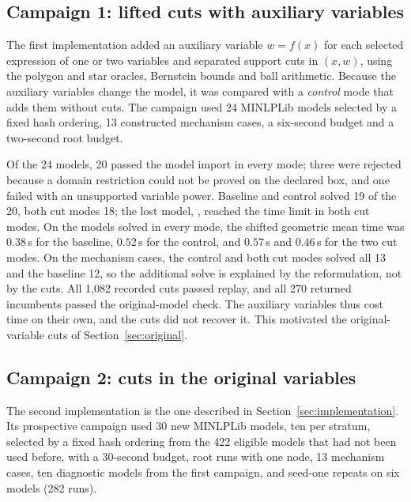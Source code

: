\subsection{Campaign 1: lifted cuts with auxiliary variables}\label{sec:campaign1}

The first implementation added an auxiliary variable $w=f(x)$ for each
selected expression of one or two variables and separated support cuts in
$(x,w)$, using the polygon and star oracles, Bernstein bounds and ball
arithmetic. Because the auxiliary variables change the model, it was
compared with a \emph{control} mode that adds them without cuts. The
campaign used 24 MINLPLib models selected by a fixed hash ordering, 13
constructed mechanism cases, a six-second budget and a two-second root
budget.

Of the 24 models, 20 passed the model import in every mode; three were
rejected because a domain restriction could not be proved on the declared
box, and one failed with an unsupported variable power. Baseline and
control solved 19 of the 20, both cut modes 18; the lost model,
, reached the time limit in both cut modes. On the
models solved in every mode, the shifted geometric mean time was
$0.38$\,s for the baseline, $0.52$\,s for the control, and $0.57$\,s and
$0.46$\,s for the two cut modes. On the mechanism cases, the control and
both cut modes solved all 13 and the baseline 12, so the additional solve
is explained by the reformulation, not by the cuts. All 1{,}082 recorded
cuts passed replay, and all 270 returned incumbents passed the
original-model check. The auxiliary variables thus cost time on their own,
and the cuts did not recover it. This motivated the original-variable cuts
of Section~\ref{sec:original}.

\subsection{Campaign 2: cuts in the original variables}\label{sec:campaign2}

The second implementation is the one described in
Section~\ref{sec:implementation}. Its prospective campaign used 30 new
MINLPLib models, ten per stratum, selected by a fixed hash ordering from
the 422 eligible models that had not been used before, with a 30-second
budget, root runs with one node, 13 mechanism cases, ten diagnostic models
from the first campaign, and seed-one repeats on six models (282 runs).

